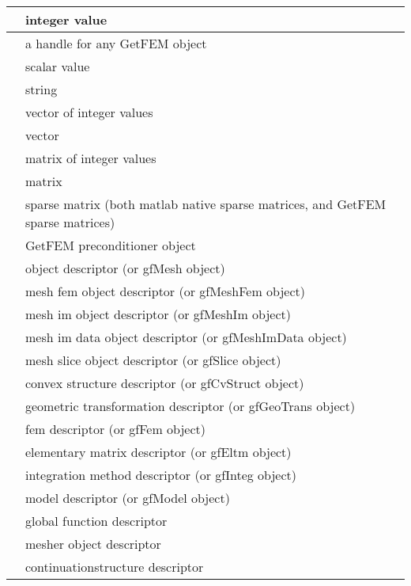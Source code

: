 \documentclass[a4paper,11pt,english]{sphinxmanual}
\begin{document}
\begin{savenotes}\sphinxattablestart
\centering
\begin{tabulary}{\linewidth}[t]{|T|T|}
\hline

&
integer value
\\
\hline
{}
&
a handle for any GetFEM object
\\
\hline
{}
&
scalar value
\\
\hline
{}
&
string
\\
\hline
{}
&
vector of integer values
\\
\hline
{}
&
vector
\\
\hline
{}
&
matrix of integer values
\\
\hline
{}
&
matrix
\\
\hline
{}
&
sparse matrix (both matlab native sparse
matrices, and GetFEM sparse matrices)
\\
\hline
{}
&
GetFEM preconditioner object
\\
\hline
{}
&
object descriptor (or gfMesh object)
\\
\hline
{}
&
mesh fem object descriptor (or gfMeshFem object)
\\
\hline
{}
&
mesh im object descriptor (or gfMeshIm object)
\\
\hline
{}
&
mesh im data object descriptor (or gfMeshImData object)
\\
\hline
{}
&
mesh slice object descriptor (or gfSlice object)
\\
\hline
{}
&
convex structure descriptor (or gfCvStruct object)
\\
\hline
{}
&
geometric transformation descriptor (or
gfGeoTrans object)
\\
\hline
{}
&
fem descriptor (or gfFem object)
\\
\hline
{}
&
elementary matrix descriptor (or gfEltm object)
\\
\hline
{}
&
integration method descriptor (or gfInteg object)
\\
\hline
{}
&
model descriptor (or gfModel object)
\\
\hline
{}
&
global function descriptor
\\
\hline
{}
&
mesher object descriptor
\\
\hline
{}
&
continuation\sphinxhyphen{}structure descriptor
\\
\hline
\end{tabulary}
\par
\sphinxattableend\end{savenotes}
\end{document}
